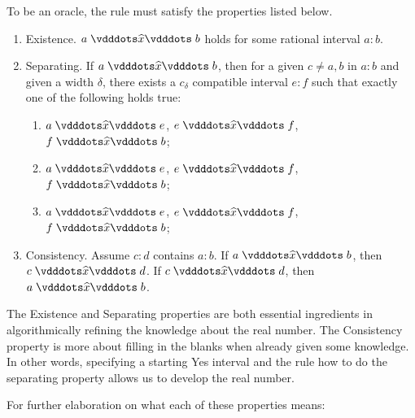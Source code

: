 \documentclass[12pt]{article}
\begin{document}
To be an oracle, the rule must satisfy the properties listed below.
\begin{enumerate}
    \item Existence. $a \xora b$ holds for some rational interval $a:b$.
    \item Separating. If $a \xora b$, then for a given $c \neq a, b$ in $a:b$ and given a width $\delta$, there exists a $c_{\delta}$ compatible interval $e:f$ such that exactly one of the following holds true:
    \begin{enumerate}
        \item $a \xora e$, \sout{$e \xora f$}, \sout{$f \xora b$};
        \item \sout{$a \xora e$}, $e \xora f$, \sout{$f \xora b$};
        \item \sout{$a \xora e$}, \sout{$e \xora f$}, $f \xora b$;
    \end{enumerate}
    \item Consistency. Assume $c:d$ contains $a:b$. If $a \xora b$, then $ c \xora d$. If \sout{$c\xora d$}, then \sout{$a\xora b$}. 

\end{enumerate}


The Existence and Separating properties are both essential ingredients in algorithmically refining the knowledge about the real number. The Consistency property is more about filling in the blanks when already given some knowledge. In other words, specifying a starting Yes interval and the rule how to do the separating property allows us to develop the real number. 

For further elaboration on what each of these properties means:
\end{document}
